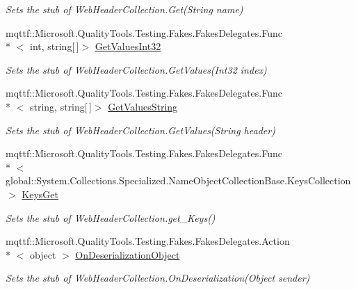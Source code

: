 \begin{DoxyCompactItemize}
\begin{DoxyCompactList}\small\item\em Sets the stub of Web\-Header\-Collection.\-Get(\-String name)\end{DoxyCompactList}\item 
mqttf\-::\-Microsoft.\-Quality\-Tools.\-Testing.\-Fakes.\-Fakes\-Delegates.\-Func\\*
$<$ int, string\mbox{[}$\,$\mbox{]}$>$ \hyperlink{class_system_1_1_net_1_1_fakes_1_1_stub_web_header_collection_ad4c9c84b1b67a0ef840e87ea891999bd}{Get\-Values\-Int32}
\begin{DoxyCompactList}\small\item\em Sets the stub of Web\-Header\-Collection.\-Get\-Values(\-Int32 index)\end{DoxyCompactList}\item 
mqttf\-::\-Microsoft.\-Quality\-Tools.\-Testing.\-Fakes.\-Fakes\-Delegates.\-Func\\*
$<$ string, string\mbox{[}$\,$\mbox{]}$>$ \hyperlink{class_system_1_1_net_1_1_fakes_1_1_stub_web_header_collection_a24b5044ac805b2607591b0fc4e617426}{Get\-Values\-String}
\begin{DoxyCompactList}\small\item\em Sets the stub of Web\-Header\-Collection.\-Get\-Values(\-String header)\end{DoxyCompactList}\item 
mqttf\-::\-Microsoft.\-Quality\-Tools.\-Testing.\-Fakes.\-Fakes\-Delegates.\-Func\\*
$<$ global\-::\-System.\-Collections.\-Specialized.\-Name\-Object\-Collection\-Base.\-Keys\-Collection $>$ \hyperlink{class_system_1_1_net_1_1_fakes_1_1_stub_web_header_collection_a5da846ff387eb3d719e1c4038734060b}{Keys\-Get}
\begin{DoxyCompactList}\small\item\em Sets the stub of Web\-Header\-Collection.\-get\-\_\-\-Keys()\end{DoxyCompactList}\item 
mqttf\-::\-Microsoft.\-Quality\-Tools.\-Testing.\-Fakes.\-Fakes\-Delegates.\-Action\\*
$<$ object $>$ \hyperlink{class_system_1_1_net_1_1_fakes_1_1_stub_web_header_collection_a3c4aab9617e0f621404b1dcb01e9d7c2}{On\-Deserialization\-Object}
\begin{DoxyCompactList}\small\item\em Sets the stub of Web\-Header\-Collection.\-On\-Deserialization(\-Object sender)\end{DoxyCompactList}\item 

\end{DoxyCompactItemize}
